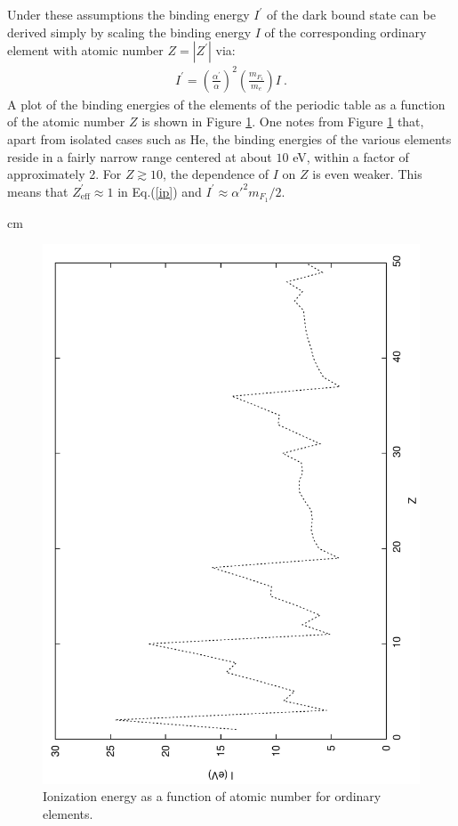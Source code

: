 \documentclass[12pt]{article}
\begin{document}
Under these assumptions the binding energy $I ^{'}$ of the dark bound
state can be derived simply by scaling the binding energy $I$ of the
corresponding ordinary element with atomic number $Z = |Z ^{'}|$ via:
%
\begin{eqnarray}
I ^{'} = \left ( \frac{\alpha ^{'}}{\alpha} \right ) ^2 \left ( \frac{m
_{F_1}}{m _e} \right ) I \ .
\label{scaling}
\end{eqnarray}
%
A plot of the binding energies of the elements of the periodic table as
a function of the atomic number $Z$ is shown in Figure
\ref{fig:Ionization}. One notes from Figure \ref{fig:Ionization} that,
apart from isolated cases such as He, the binding energies of the
various elements reside in a fairly narrow range centered at about $10$
eV, within a factor of approximately 2. For $Z \gtrsim 10$, the
dependence of $I$ on $Z$ is even weaker. This means that $Z
_{\text{eff}} ^{'} \approx 1$ in Eq.(\ref{ip}) and $I ^{'} \approx
{\alpha '} ^2m _{F_1}/2$.

 cm

%
\begin{figure}[htpb]
    \centering
        \includegraphics[scale=0.5, angle=270]{fig6}
    \caption{Ionization energy as a function of atomic number for
ordinary elements.}
    \label{fig:Ionization}
\end{figure}
%
\newpage
\end{document}
